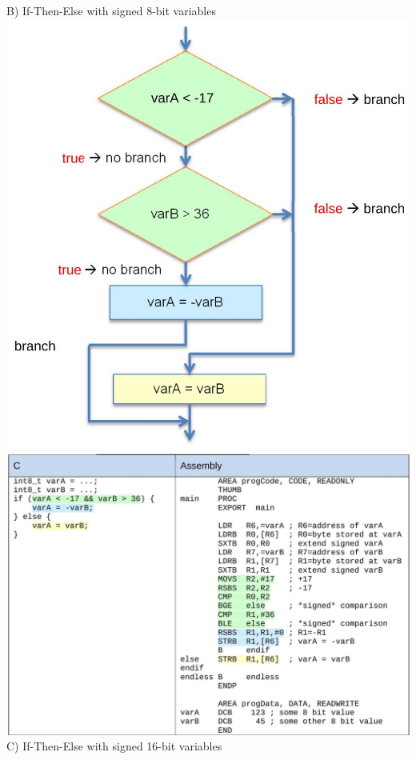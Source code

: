B) If-Then-Else with signed 8-bit variables\\
\includegraphics[width=\linewidth]{images/2025_01_02_7eee2d56b23c0199f878g-6}\\
\includegraphics[width=\linewidth]{images/2025_01_02_7eee2d56b23c0199f878g-6(1)}\\
C) If-Then-Else with signed 16-bit variables\\
